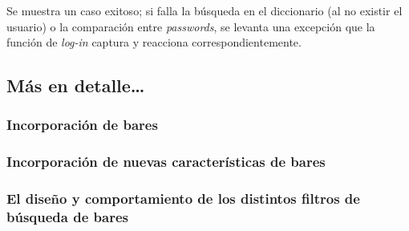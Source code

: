 \par Se muestra un caso exitoso; si falla la búsqueda en el diccionario (al no existir el usuario) o la comparación entre \textit{passwords}, se levanta una excepción que la función de \textit{log-in} captura y reacciona correspondientemente.

\subsection{Más en detalle\ldots}

\subsubsection{Incorporación de bares}

\subsubsection{Incorporación de nuevas características de bares}

\subsubsection{El diseño y comportamiento de los distintos filtros de búsqueda de bares}

